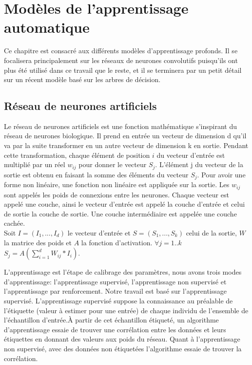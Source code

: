 \chapter{Modèles de l'apprentissage automatique}
Ce chapitre est consacré aux différents modèles d'apprentissage profonds. Il se focalisera principalement sur les réseaux de neurones convolutifs puisqu'ils ont plus été utilisé dans ce travail que le reste, et il se terminera par un petit détail sur un récent modèle basé sur les arbres de décision. 
\section{Réseau de neurones artificiels}%
Le réseau de neurones artificiels est une fonction mathématique s'inspirant du réseau de neurones biologique. Il prend en entrée un vecteur de dimension d qu'il va par la suite transformer en un autre vecteur de dimension k en sortie. Pendant cette transformation, chaque élément de position $i$ du vecteur d'entrée est multiplié par un réel $w_{ij}$ pour donner le vecteur $S_j$. L'élément j du vecteur de la sortie est obtenu en faisant la somme des éléments du vecteur $S_j$. Pour avoir une forme non linéaire, une fonction non linéaire est appliquée sur la sortie. Les $w_{ij}$ sont appelés les poids de connexions entre les neurones. Chaque vecteur est appelé une couche, ainsi le vecteur d'entrée est appelé la couche d'entrée et celui de sortie la couche de sortie. Une couche intermédiaire est appelée une couche cachée.\\
Soit $I = (I_1, ..., I_d)$ le vecteur d'entrée et $S = (S_1,...,S_k) $ celui de la sortie, $W$ la matrice des poids et $A$ la fonction d'activation. $\forall j = 1..k$ $S_j = A(\sum \limits_{i=1}^d W_{ij}*I_i) $.

L'apprentissage est l'étape de calibrage des paramètres, nous avons trois modes d'apprentissage: l'apprentissage supervisé, l'apprentissage non supervisé et l'apprentissage par renforcement. Notre travail est basé sur l'apprentissage supervisé.
L'apprentissage supervisé suppose la connaissance au préalable de l'étiquette (valeur à estimer pour une entrée) de chaque individu de l'ensemble de l'échantillon d'entrée.À partir de cet échantillon étiqueté, un algorithme d'apprentissage essaie de trouver une corrélation entre les données et leurs étiquettes en donnant des valeurs aux poids du réseau. Quant à l'apprentissage non supervisé, avec des données non étiquetées l'algorithme essaie de trouver la corrélation.

